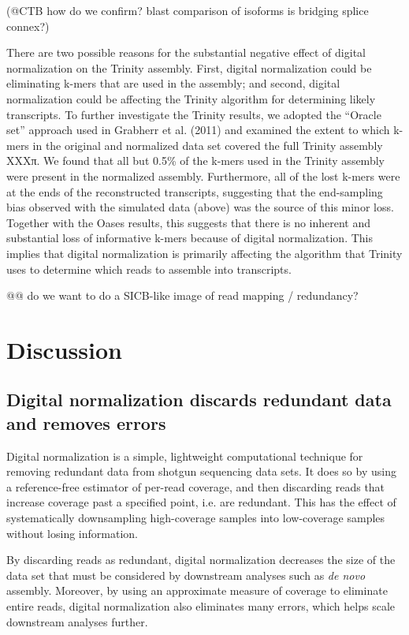 \documentclass[10pt]{article}
\begin{document}
(@CTB how do we confirm?  blast comparison of isoforms is bridging splice connex?)

There are two possible reasons for the substantial negative effect of
digital normalization on the Trinity assembly.  First, digital
normalization could be eliminating k-mers that are used in the
assembly; and second, digital normalization could be affecting the
Trinity algorithm for determining likely transcripts.  To further
investigate the Trinity results, we adopted the ``Oracle set''
approach used in Grabherr et al. (2011) and examined the extent to
which k-mers in the original and normalized data set covered the full
Trinity assembly XXXπ.  We found that all but 0.5\% of the k-mers used in
the Trinity assembly were present in the normalized assembly.
Furthermore, all of the lost k-mers were at the ends of the
reconstructed transcripts, suggesting that the end-sampling bias
observed with the simulated data (above) was the source of this minor loss.
Together with the Oases results, this suggests that there is no
inherent and substantial loss of informative k-mers because of digital
normalization.  This implies that digital normalization is primarily
affecting the algorithm that Trinity uses to determine which reads to
assemble into transcripts.


@@ do we want to do a SICB-like image of read mapping / redundancy?

\section*{Discussion}

\subsection*{Digital normalization discards redundant data and removes errors}

Digital normalization is a simple, lightweight computational technique
for removing redundant data from shotgun sequencing data sets.  It
does so by using a reference-free estimator of per-read coverage, and
then discarding reads that increase coverage past a specified point,
i.e. are redundant.  This has the effect of systematically
downsampling high-coverage samples into low-coverage samples without
losing information.

By discarding reads as redundant, digital normalization decreases the
size of the data set that must be considered by downstream analyses
such as {\em de novo} assembly.  Moreover, by using an approximate
measure of coverage to eliminate entire reads, digital normalization
also eliminates many errors, which helps scale downstream analyses
further.
\end{document}
